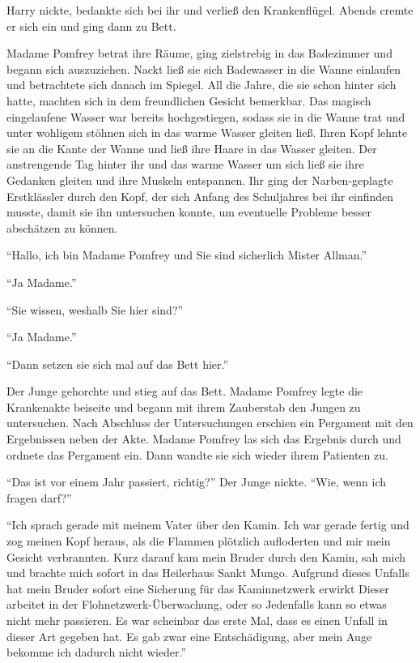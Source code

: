 Harry nickte, bedankte sich bei ihr und verließ den Krankenflügel. Abends cremte er sich ein und ging dann zu Bett.

\trenn

Madame Pomfrey betrat ihre Räume, ging zielstrebig in das Badezimmer und begann sich auszuziehen. Nackt ließ sie sich Badewasser in die Wanne einlaufen und betrachtete sich danach im Spiegel. All die Jahre, die sie schon hinter sich hatte, machten sich in dem freundlichen Gesicht bemerkbar. Das magisch eingelaufene Wasser war bereits hochgestiegen, sodass sie in die Wanne trat und unter wohligem stöhnen sich in das warme Wasser gleiten ließ. Ihren Kopf lehnte sie an die Kante der Wanne und ließ ihre Haare in das Wasser gleiten. Der anstrengende Tag hinter ihr und das warme Wasser um sich ließ sie ihre Gedanken gleiten und ihre Muskeln entspannen. Ihr ging der Narben-geplagte Erstklässler durch den Kopf, der sich Anfang des Schuljahres bei ihr einfinden musste, damit sie ihn untersuchen konnte, um eventuelle Probleme besser abschätzen zu können.

\begin{rueckblick}
\enquote{Hallo, ich bin Madame Pomfrey und Sie sind sicherlich Mister Allman.}

\enquote{Ja Madame.}

\enquote{Sie wissen, weshalb Sie hier sind?}

\enquote{Ja Madame.}

\enquote{Dann setzen sie sich mal auf das Bett hier.}

Der Junge gehorchte und stieg auf das Bett. Madame Pomfrey legte die Krankenakte beiseite und begann mit ihrem Zauberstab den Jungen zu untersuchen. Nach Abschluss der Untersuchungen erschien ein Pergament mit den Ergebnissen neben der Akte. Madame Pomfrey las sich das Ergebnis durch und ordnete das Pergament ein. Dann wandte sie sich wieder ihrem Patienten zu.

\enquote{Das ist vor einem Jahr passiert, richtig?} Der Junge nickte. \enquote{Wie, wenn ich fragen darf?}

\enquote{Ich sprach gerade mit meinem Vater über den Kamin. Ich war gerade fertig und zog meinen Kopf heraus, als die Flammen plötzlich aufloderten und mir mein Gesicht verbrannten. Kurz darauf kam mein Bruder durch den Kamin, sah mich und brachte mich sofort in das Heilerhaus Sankt Mungo. Aufgrund dieses Unfalls hat mein Bruder sofort eine Sicherung für das Kaminnetzwerk erwirkt \gst Dieser arbeitet in der Flohnetzwerk-Überwachung, oder so \gst Jedenfalls kann so etwas nicht mehr passieren. Es war scheinbar das erste Mal, dass es einen Unfall in dieser Art gegeben hat. Es gab zwar eine Entschädigung, aber mein Auge bekomme ich dadurch nicht wieder.}
\end{rueckblick}


